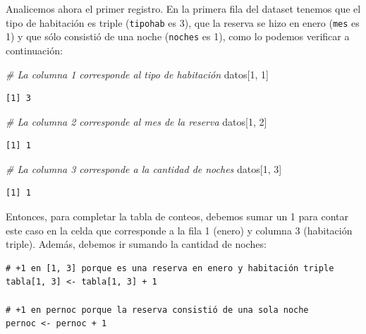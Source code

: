 \documentclass[
]{book}
\newenvironment{Shaded}{\begin{snugshade}}{\end{snugshade}}
\newcommand{\CommentTok}[1]{\textcolor[rgb]{0.56,0.35,0.01}{\textit{#1}}}
\newcommand{\DecValTok}[1]{\textcolor[rgb]{0.00,0.00,0.81}{#1}}
\newcommand{\NormalTok}[1]{#1}
\begin{document}
Analicemos ahora el primer registro. En la primera fila del dataset tenemos que el tipo de habitación es triple (\texttt{tipohab} es 3), que la reserva se hizo en enero (\texttt{mes} es 1) y que sólo consistió de una noche (\texttt{noches} es 1), como lo podemos verificar a continuación:

\begin{Shaded}
\begin{Highlighting}[]
\CommentTok{\# La columna 1 corresponde al tipo de habitación}
\NormalTok{datos[}\DecValTok{1}\NormalTok{, }\DecValTok{1}\NormalTok{]}
\end{Highlighting}
\end{Shaded}

\begin{verbatim}
[1] 3
\end{verbatim}

\begin{Shaded}
\begin{Highlighting}[]
\CommentTok{\# La columna 2 corresponde al mes de la reserva}
\NormalTok{datos[}\DecValTok{1}\NormalTok{, }\DecValTok{2}\NormalTok{]}
\end{Highlighting}
\end{Shaded}

\begin{verbatim}
[1] 1
\end{verbatim}

\begin{Shaded}
\begin{Highlighting}[]
\CommentTok{\# La columna 3 corresponde a la cantidad de noches}
\NormalTok{datos[}\DecValTok{1}\NormalTok{, }\DecValTok{3}\NormalTok{]}
\end{Highlighting}
\end{Shaded}

\begin{verbatim}
[1] 1
\end{verbatim}

Entonces, para completar la tabla de conteos, debemos sumar un 1 para contar este caso en la celda que corresponde a la fila 1 (enero) y columna 3 (habitación triple). Además, debemos ir sumando la cantidad de noches:

\begin{verbatim}
# +1 en [1, 3] porque es una reserva en enero y habitación triple
tabla[1, 3] <- tabla[1, 3] + 1      

# +1 en pernoc porque la reserva consistió de una sola noche
pernoc <- pernoc + 1
\end{verbatim}
\end{document}

